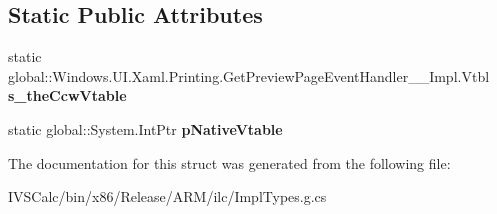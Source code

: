 \subsection*{Static Public Attributes}
\begin{DoxyCompactItemize}
\item 
\mbox{\label{struct_windows_1_1_u_i_1_1_xaml_1_1_printing_1_1_get_preview_page_event_handler_____impl_1_1_vtbl_a26ac3e549b672663097659e68f3b19a6}} 
static global\+::\+Windows.\+U\+I.\+Xaml.\+Printing.\+Get\+Preview\+Page\+Event\+Handler\+\_\+\+\_\+\+Impl.\+Vtbl {\bfseries s\+\_\+the\+Ccw\+Vtable}
\item 
\mbox{\label{struct_windows_1_1_u_i_1_1_xaml_1_1_printing_1_1_get_preview_page_event_handler_____impl_1_1_vtbl_ac5e8c3c4db9ebcdefc7461163c16c844}} 
static global\+::\+System.\+Int\+Ptr {\bfseries p\+Native\+Vtable}
\end{DoxyCompactItemize}


The documentation for this struct was generated from the following file\+:\begin{DoxyCompactItemize}
\item 
I\+V\+S\+Calc/bin/x86/\+Release/\+A\+R\+M/ilc/Impl\+Types.\+g.\+cs\end{DoxyCompactItemize}
